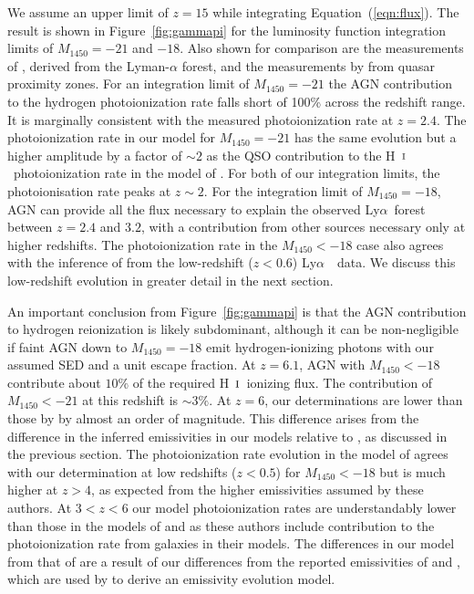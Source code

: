 \documentclass[fleqn,usenatbib]{mnras}
\def\lya{Ly$\alpha$~}
\def\HI{\hbox{H~$\scriptstyle\rm I$}}
\begin{document}
We assume an
upper limit of $z=15$ while integrating Equation~(\ref{eqn:flux}).
The result is shown in Figure~\ref{fig:gammapi} for the luminosity
function integration limits of $M_{1450}=-21$ and $-18$.  Also shown
for comparison are the measurements of \citet{2013MNRAS.436.1023B},
derived from the Lyman-$\alpha$ forest, and the measurements by
\citet{2011MNRAS.412.2543C} from quasar proximity zones.
For an
integration limit of $M_{1450}=-21$ the AGN contribution to the
hydrogen photoionization rate falls short of 100\% across the redshift
range.  It is marginally consistent with the measured photoionization
rate at $z=2.4$.  The photoionization rate in our model for
$M_{1450}=-21$ has the same evolution but a higher amplitude by a
factor of $\sim 2$ as the QSO contribution to the \HI\ photoionization
rate in the model of \citet{2012ApJ...746..125H}.  For both of our
integration limits, the photoionisation rate peaks at $z\sim 2$.  For
the integration limit of $M_{1450}=-18$, AGN can provide all the flux
necessary to explain the observed \lya forest between $z=2.4$ and
$3.2$, with a contribution from other sources necessary only at higher
redshifts.  The photoionization rate in the $M_{1450}<-18$ case also
agrees with the inference of \citet{2017MNRAS.467.3172G} from the
low-redshift ($z<0.6$) \lya\ data.  We discuss this low-redshift
evolution in greater detail in the next section.

An important conclusion from Figure~\ref{fig:gammapi} is that the AGN
contribution to hydrogen reionization is likely subdominant, although
it can be non-negligible if faint AGN down to $M_{1450}=-18$ emit
hydrogen-ionizing photons with our assumed SED and a unit escape
fraction.  At $z=6.1$, AGN with $M_{1450}<-18$ contribute about $10\%$
of the required \HI\ ionizing flux.  The contribution of
$M_{1450}<-21$ at this redshift is $\sim 3\%$.  At $z=6$, our
determinations are lower than those by \citet{2015AA...578A..83G} by
almost an order of magnitude.  This difference arises from the
difference in the inferred emissivities in our models relative to
\citet{2015AA...578A..83G}, as discussed in the previous section.  The
photoionization rate evolution in the model of
\citet{2015ApJ...813L...8M} agrees with our determination at low
redshifts ($z<0.5$) for $M_{1450}<-18$ but is much higher at $z>4$, as
expected from the higher emissivities assumed by these authors.  At
$3<z<6$ our model photoionization rates are understandably lower than
those in the models of \citet{2017ApJ...837..106O} and
\citet{2018arXiv180104931P} as these authors include contribution to
the photoionization rate from galaxies in their models. The
differences in our model from that of \citet{2015MNRAS.451L..30K} are
a result of our differences from the reported emissivities of
\citet{2009MNRAS.392...19C} and \citet{2013A&A...551A..29P}, which are
used by \citet{2015MNRAS.451L..30K} to derive an emissivity evolution
model.
\end{document}
